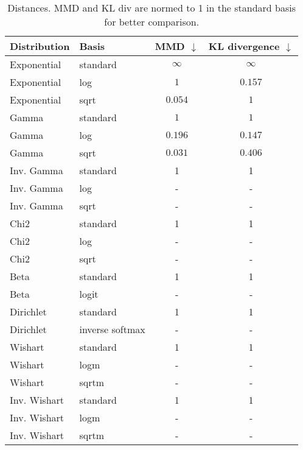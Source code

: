 \documentclass{article}
\begin{document}
\begin{table}[htb]
	\centering
	\caption{Distances. MMD and KL div are normed to 1 in the standard basis for better comparison. }
	\begin{tabular}{llcc}
		\toprule
		\textbf{Distribution} & Basis & MMD $\downarrow$& KL divergence $\downarrow$ \\
		\midrule
		Exponential	& standard & $\infty$ & $\infty$ \\
		Exponential	& log & $1$ & $0.157 $ \\ 
		Exponential	& sqrt & $0.054$ & $1$ \\ 
		\hdashline
		Gamma		& standard & $1$ & $1$  \\
		Gamma		& log & $0.196$ & $0.147$  \\
		Gamma		& sqrt & $0.031$ & $0.406$ \\
		\hdashline
		Inv. Gamma & standard & 1 & 1 \\
		Inv. Gamma & log & - & - \\
		Inv. Gamma & sqrt & - & - \\
		\hdashline
		Chi2        & standard & 1 & 1 \\
		Chi2        & log & - & - \\
		Chi2        & sqrt & - & - \\
		\hdashline
		Beta		& standard & 1 & 1 \\
		Beta		& logit & - & - \\
		\hdashline
		Dirichlet 	& standard &  1 & 1 \\		
		Dirichlet 	& inverse softmax &  - & - \\
		\hdashline
		Wishart	    & standard & 1 & 1 \\
		Wishart	    & logm & - & - \\
		Wishart	    & sqrtm & - & - \\
		\hdashline
		Inv. Wishart & standard & 1 & 1 \\
		Inv. Wishart & logm & - & - \\
		Inv. Wishart & sqrtm & - & - \\
		\bottomrule
	\end{tabular}
\end{table}

\pagebreak


















\end{document}
